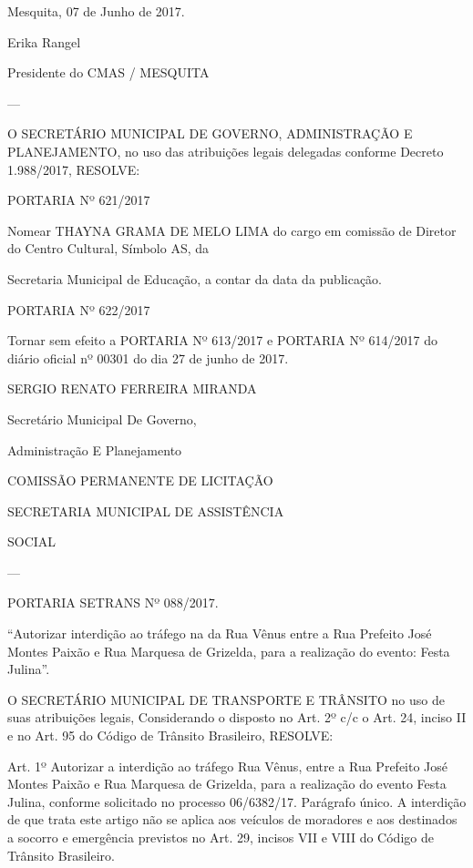 \documentclass{doliberto}
\begin{document}
Mesquita, 07 de Junho de 2017.  

Erika Rangel 

Presidente do CMAS / MESQUITA 

---

O  SECRETÁRIO  MUNICIPAL  DE  GOVERNO, 
ADMINISTRAÇÃO E PLANEJAMENTO, no uso das 
atribuições  legais  delegadas  conforme  Decreto 
1.988/2017, RESOLVE: 
 
PORTARIA Nº 621/2017 
 
Nomear  THAYNA  GRAMA  DE  MELO  LIMA  do  cargo  em 
comissão  de  Diretor  do  Centro  Cultural,  Símbolo  AS,  da 


Secretaria  Municipal  de  Educação,  a  contar  da  data  da 
publicação. 
 
PORTARIA Nº 622/2017 
 
Tornar sem efeito a PORTARIA Nº 613/2017 e PORTARIA 
Nº 614/2017 do diário oficial nº 00301 do dia 27 de junho 
de 2017. 
 

SERGIO RENATO FERREIRA MIRANDA 

Secretário Municipal De Governo, 

Administração E Planejamento 

 

COMISSÃO PERMANENTE DE LICITAÇÃO 

SECRETARIA MUNICIPAL DE ASSISTÊNCIA 

SOCIAL 

---

PORTARIA SETRANS Nº 088/2017. 

 

“Autorizar  interdição  ao  tráfego  na  da  Rua  Vênus  entre  a 
Rua  Prefeito  José  Montes  Paixão  e  Rua  Marquesa  de 
Grizelda, para a realização do evento: Festa Julina”. 
 
O  SECRETÁRIO  MUNICIPAL  DE  TRANSPORTE  E 
TRÂNSITO no uso de suas atribuições legais,  
Considerando o disposto no Art. 2º c/c o Art. 24, inciso II e 
no Art. 95 do Código de Trânsito Brasileiro,  
RESOLVE:  

 
Art. 1º Autorizar a interdição ao tráfego Rua Vênus, entre a  
Rua  Prefeito  José  Montes  Paixão  e  Rua  Marquesa  de 
Grizelda, para a realização do evento Festa Julina, conforme 
solicitado no processo 06/6382/17. 
Parágrafo único. A interdição de que trata este artigo não se 
aplica  aos  veículos  de  moradores  e  aos  destinados  a 
socorro e emergência previstos no Art. 29, incisos VII e VIII 
do Código de Trânsito Brasileiro.  
 
\end{document}
